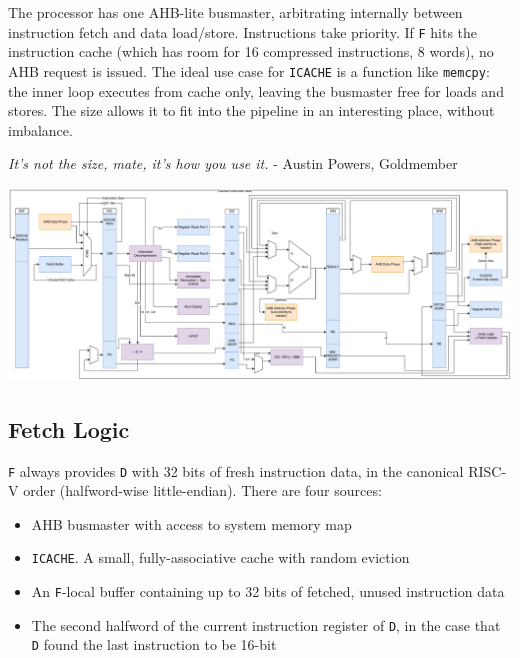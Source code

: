 \documentclass{article}
\begin{document}
The processor has one AHB-lite busmaster, arbitrating internally between instruction fetch and data load/store. Instructions take priority. If \texttt{F} hits the instruction cache (which has room for 16 compressed instructions, 8 words), no AHB request is issued. The ideal use case for \texttt{ICACHE} is a function like \texttt{memcpy}: the inner loop executes from cache only, leaving the busmaster free for loads and stores. The size allows it to fit into the pipeline in an interesting place, without imbalance.

\begin{displayquote}
\textit{It's not the size, mate, it's how you use it.} - Austin Powers, Goldmember
\end{displayquote}


\newpage

\begin{center}
	\begin{sideways}
		\begin{minipage}{\textheight}
			\includegraphics[width=\textheight]{diagrams/cpu_full.pdf}
			\label{diagram:cpu_pipeline}
		\end{minipage}
	\end{sideways}
\end{center}

\newpage

\subsection{Fetch Logic}

\texttt{F} always provides \texttt{D} with 32 bits of fresh instruction data, in the canonical RISC-V order (halfword-wise little-endian). There are four sources:

\begin{itemize}
\item AHB busmaster with access to system memory map
\item \texttt{ICACHE}. A small, fully-associative cache with random eviction
\item An \texttt{F}-local buffer containing up to 32 bits of fetched, unused instruction data
\item The second halfword of the current instruction register of \texttt{D}, in the case that \texttt{D} found the last instruction to be 16-bit
\end{itemize}
\end{document}
